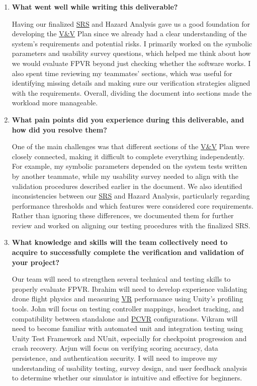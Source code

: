 \documentclass[12pt, titlepage]{article}
\begin{document}
\begin{enumerate}
    \item \textbf{What went well while writing this deliverable?}

    Having our finalized \hyperlink{abbr:SRS}{SRS} and Hazard Analysis gave us a good foundation for developing the \hyperlink{abbr:VnV}{V\&V} Plan since we already had a clear understanding of the system's requirements and potential risks. I primarily worked on the symbolic parameters and usability survey questions, which helped me think about how we would evaluate FPVR beyond just checking whether the software works. I also spent time reviewing my teammates' sections, which was useful for identifying missing details and making sure our verification strategies aligned with the requirements. Overall, dividing the document into sections made the workload more manageable.

    \item \textbf{What pain points did you experience during this deliverable, and how did you resolve them?}

    One of the main challenges was that different sections of the \hyperlink{abbr:VnV}{V\&V} Plan were closely connected, making it difficult to complete everything independently. For example, my symbolic parameters depended on the system tests written by another teammate, while my usability survey needed to align with the validation procedures described earlier in the document. We also identified inconsistencies between our \hyperlink{abbr:SRS}{SRS} and Hazard Analysis, particularly regarding performance thresholds and which features were considered core requirements. Rather than ignoring these differences, we documented them for further review and worked on aligning our testing procedures with the finalized SRS.

    \item \textbf{What knowledge and skills will the team collectively need to acquire to successfully complete the verification and validation of your project?}

    Our team will need to strengthen several technical and testing skills to properly evaluate FPVR. Ibrahim will need to develop experience validating drone flight physics and measuring \hyperlink{abbr:VR}{VR} performance using Unity's profiling tools. John will focus on testing controller mappings, headset tracking, and compatibility between standalone and \hyperlink{abbr:PCVR}{PCVR} configurations. Vikram will need to become familiar with automated unit and integration testing using Unity Test Framework and NUnit, especially for checkpoint progression and crash recovery. Arjun will focus on verifying scoring accuracy, data persistence, and authentication security. I will need to improve my understanding of usability testing, survey design, and user feedback analysis to determine whether our simulator is intuitive and effective for beginners.


\end{enumerate}
\end{document}
